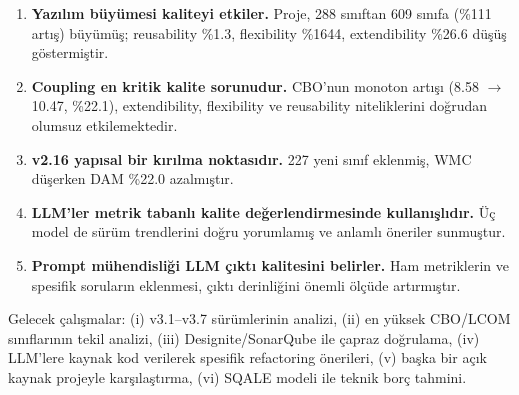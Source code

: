 \documentclass[conference]{IEEEtran}
\begin{document}
\begin{enumerate}
\item \textbf{Yaz{\i}l{\i}m b\"uy\"umesi kaliteyi etkiler.} Proje, 288 s{\i}n{\i}ftan 609 s{\i}n{\i}fa (\%111 art{\i}\c{s}) b\"uy\"um\"u\c{s}; reusability \%1.3, flexibility \%1644, extendibility \%26.6 d\"u\c{s}\"u\c{s} g\"ostermi\c{s}tir.

\item \textbf{Coupling en kritik kalite sorunudur.} CBO'nun monoton art{\i}\c{s}{\i} (8.58 $\rightarrow$ 10.47, \%22.1), extendibility, flexibility ve reusability niteliklerini do\u{g}rudan olumsuz etkilemektedir.

\item \textbf{v2.16 yap{\i}sal bir k{\i}r{\i}lma noktas{\i}d{\i}r.} 227 yeni s{\i}n{\i}f eklenmi\c{s}, WMC d\"u\c{s}erken DAM \%22.0 azalm{\i}\c{s}t{\i}r.

\item \textbf{LLM'ler metrik tabanl{\i} kalite de\u{g}erlendirmesinde kullan{\i}\c{s}l{\i}d{\i}r.} \"U\c{c} model de s\"ur\"um trendlerini do\u{g}ru yorumlam{\i}\c{s} ve anlaml{\i} \"oneriler sunmu\c{s}tur.

\item \textbf{Prompt m\"uhendisli\u{g}i LLM \c{c}{\i}kt{\i} kalitesini belirler.} Ham metriklerin ve spesifik sorular{\i}n eklenmesi, \c{c}{\i}kt{\i} derinli\u{g}ini \"onemli \"ol\c{c}\"ude art{\i}rm{\i}\c{s}t{\i}r.
\end{enumerate}

Gelecek \c{c}al{\i}\c{s}malar: (i) v3.1--v3.7 s\"ur\"umlerinin analizi, (ii) en y\"uksek CBO/LCOM s{\i}n{\i}flar{\i}n{\i}n tekil analizi, (iii) Designite/SonarQube ile \c{c}apraz do\u{g}rulama, (iv) LLM'lere kaynak kod verilerek spesifik refactoring \"onerileri, (v) ba\c{s}ka bir a\c{c}{\i}k kaynak projeyle kar\c{s}{\i}la\c{s}t{\i}rma, (vi) SQALE modeli ile teknik bor\c{c} tahmini.


\end{document}
